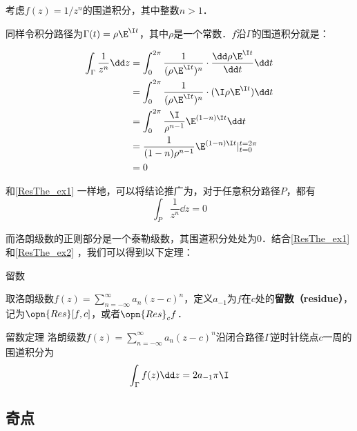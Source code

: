 \begin{example}{}\label{ResThe_ex2}
考虑$f(z)=1/z^n$的围道积分，其中整数$n>1$．

同样令积分路径为$\Gamma(t)=\rho\E^{\I t}$，其中$\rho$是一个常数．$f$沿$\Gamma$的围道积分就是：

\begin{equation}
\begin{aligned}
\int_{\Gamma}\frac{1}{z^n}\dd z&=\int^{2\pi}_0\frac{1}{(\rho\E^{\I t})^n}\cdot\frac{\dd\rho\E^{\I t}}{\dd t}\dd t\\
&=\int_0^{2\pi}\frac{1}{(\rho\E^{\I t})^n}\cdot (\I \rho \E^{\I t})\dd t\\
&=\int_0^{2\pi}\frac{\I}{\rho^{n-1}}\E^{(1-n)\I t}\dd t\\
&=\frac{1}{(1-n)\rho^{n-1}}\E^{(1-n)\I t}|^{t=2\pi}_{t=0}\\
&=0
\end{aligned}
\end{equation}

和\autoref{ResThe_ex1} 一样地，可以将结论推广为，对于任意积分路径$P$，都有
\begin{equation}
\int_P\frac{1}{z^n}\dd z=0
\end{equation}

\end{example}

而洛朗级数的正则部分是一个泰勒级数，其围道积分处处为$0$．结合\autoref{ResThe_ex1} 和\autoref{ResThe_ex2} ，我们可以得到以下定理：

\begin{definition}{留数}

取洛朗级数$f(z)=\sum\limits_{n=-\infty}^{\infty} a_n(z-c)^n$，定义$a_{-1}$为$f$在$c$处的\textbf{留数（residue）}，记为$\opn{Res}[f, c]$，或者$\opn{Res}_cf$．

\end{definition}

\begin{theorem}{留数定理}\label{ResThe_the1}
洛朗级数$f(z)=\sum\limits_{n=-\infty}^{\infty} a_n(z-c)^n$沿闭合路径$\Gamma$逆时针绕点$c$一周的围道积分为
\begin{equation}
\int_\Gamma f(z)\dd z=2a_{-1}\pi\I
\end{equation}
\end{theorem}

\subsection{奇点}



